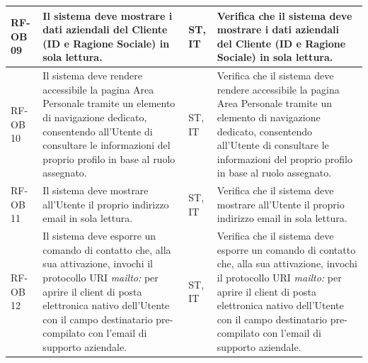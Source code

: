 \documentclass[a4paper,11pt,oneside]{scrartcl}
\begin{document}
\begin{longtable}{|p{1.5cm}|p{4.5cm}|p{1.8cm}|p{6cm}|}
    RF-OB 09         & Il sistema deve mostrare i dati aziendali del Cliente (ID e Ragione Sociale) in sola lettura.                                                                                                                                                                                                         & ST, IT             & Verifica che il sistema deve mostrare i dati aziendali del Cliente (ID e Ragione Sociale) in sola lettura.                                                                                                                                                                                                         \\ \hline
    RF-OB 10         & Il sistema deve rendere accessibile la pagina Area Personale tramite un elemento di navigazione dedicato, consentendo all'Utente di consultare le informazioni del proprio profilo in base al ruolo assegnato.                                                                                        & ST, IT             & Verifica che il sistema deve rendere accessibile la pagina Area Personale tramite un elemento di navigazione dedicato, consentendo all'Utente di consultare le informazioni del proprio profilo in base al ruolo assegnato.                                                                                        \\ \hline
    RF-OB 11         & Il sistema deve mostrare all'Utente il proprio indirizzo email in sola lettura.                                                                                                                                                                                                                       & ST, IT             & Verifica che il sistema deve mostrare all'Utente il proprio indirizzo email in sola lettura.                                                                                                                                                                                                                       \\ \hline
    RF-OB 12         & Il sistema deve esporre un comando di contatto che, alla sua attivazione, invochi il protocollo URI \textit{mailto:} per aprire il client di posta elettronica nativo dell'Utente con il campo destinatario pre-compilato con l'email di supporto aziendale.                                          & ST, IT             & Verifica che il sistema deve esporre un comando di contatto che, alla sua attivazione, invochi il protocollo URI \textit{mailto:} per aprire il client di posta elettronica nativo dell'Utente con il campo destinatario pre-compilato con l'email di supporto aziendale.                                          \\ \hline

\end{longtable}
\end{document}
